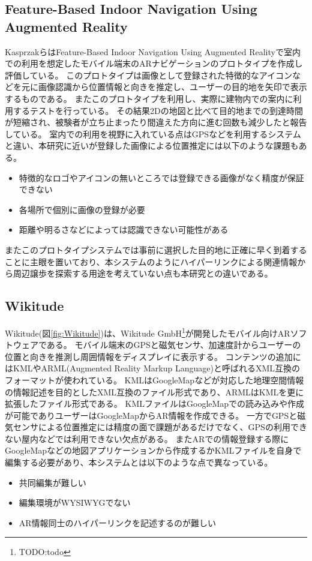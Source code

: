 \subsection{Feature-Based Indoor Navigation Using Augmented Reality}
KasprzakらはFeature-Based Indoor Navigation Using Augmented Reality\cite{6597797}で室内での利用を想定したモバイル端末のARナビゲーションのプロトタイプを作成し評価している。
このプロトタイプは画像として登録された特徴的なアイコンなどを元に画像認識から位置情報と向きを推定し、ユーザーの目的地を矢印で表示するものである。
またこのプロトタイプを利用し、実際に建物内での案内に利用するテストを行っている。
その結果2Dの地図と比べて目的地までの到達時間が短縮され、被験者が立ち止まったり間違えた方向に進む回数も減少したと報告している。
室内での利用を視野に入れている点はGPSなどを利用するシステムと違い、本研究に近いが登録した画像による位置推定には以下のような課題もある。
\begin{itemize}
  \item 特徴的なロゴやアイコンの無いところでは登録できる画像がなく精度が保証できない
  \item 各場所で個別に画像の登録が必要
  \item 距離や明るさなどによっては認識できない可能性がある
\end{itemize}
またこのプロトタイプシステムでは事前に選択した目的地に正確に早く到着することに主眼を置いており、本システムのようにハイパーリンクによる関連情報から周辺譲歩を探索する用途を考えていない点も本研究との違いである。

\subsection{Wikitude}
Wikitude(図\ref{fig:Wikitude})は、Wikitude GmbH\footnote{\textsf{TODO:todo}}が開発したモバイル向けARソフトウェアである。
モバイル端末のGPSと磁気センサ、加速度計からユーザーの位置と向きを推測し周囲情報をディスプレイに表示する。
コンテンツの追加にはKMLやARML(Augmented Reality Markup Language)と呼ばれるXML互換のフォーマットが使われている。
KMLはGoogleMapなどが対応した地理空間情報の情報記述を目的としたXML互換のファイル形式であり、ARMLはKMLを更に拡張したファイル形式である。
KMLファイルはGoogleMapでの読み込みや作成が可能でありユーザーはGoogleMapからAR情報を作成できる。
一方でGPSと磁気センサによる位置推定には精度の面で課題があるだけでなく、GPSの利用できない屋内などでは利用できない欠点がある。
またARでの情報登録する際にGoogleMapなどの地図アプリケーションから作成するかKMLファイルを自身で編集する必要があり、本システムとは以下のような点で異なっている。
\begin{itemize}
  \item 共同編集が難しい
  \item 編集環境がWYSIWYGでない
  \item AR情報同士のハイパーリンクを記述するのが難しい
\end{itemize}

